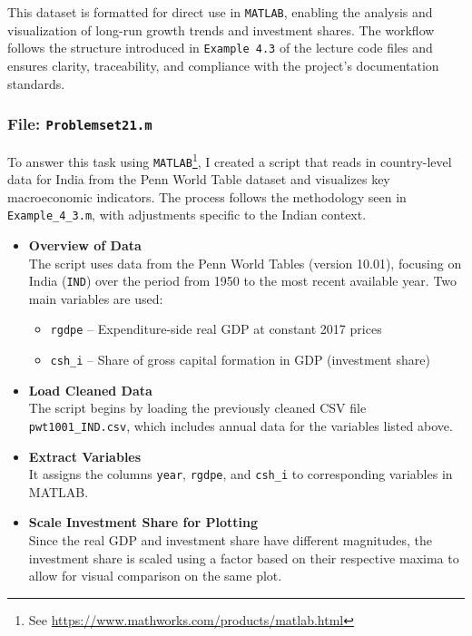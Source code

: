 \documentclass[12pt,a4paper,notitlepage]{article}
\numberwithin{equation}{section}
\begin{document}
\begin{itemize}
This dataset is formatted for direct use in \texttt{MATLAB}, enabling the analysis and visualization of long-run growth trends and investment shares. The workflow follows the structure introduced in \texttt{Example 4.3} of the lecture code files and ensures clarity, traceability, and compliance with the project’s documentation standards.


\subsubsection{   File: \texttt{Problemset21.m}}

To answer this task using \texttt{MATLAB}\footnote{See \url{https://www.mathworks.com/products/matlab.html}}, I created a script that reads in country-level data for India from the Penn World Table dataset and visualizes key macroeconomic indicators. The process follows the methodology seen in \texttt{Example\_4\_3.m}, with adjustments specific to the Indian context.


\begin{itemize}
    \item \textbf{Overview of Data} \\
    The script uses data from the Penn World Tables (version 10.01), focusing on India (\texttt{IND}) over the period from 1950 to the most recent available year. Two main variables are used:
    \begin{itemize}
        \item \texttt{rgdpe} – Expenditure-side real GDP at constant 2017 prices
        \item \texttt{csh\_i} – Share of gross capital formation in GDP (investment share)
    \end{itemize}

    \item \textbf{Load Cleaned Data} \\
    The script begins by loading the previously cleaned CSV file \texttt{pwt1001\_IND.csv}, which includes annual data for the variables listed above.

    \item \textbf{Extract Variables} \\
    It assigns the columns \texttt{year}, \texttt{rgdpe}, and \texttt{csh\_i} to corresponding variables in MATLAB.

    \item \textbf{Scale Investment Share for Plotting} \\
    Since the real GDP and investment share have different magnitudes, the investment share is scaled using a factor based on their respective maxima to allow for visual comparison on the same plot.


\end{itemize}
\end{itemize}
\end{document}
